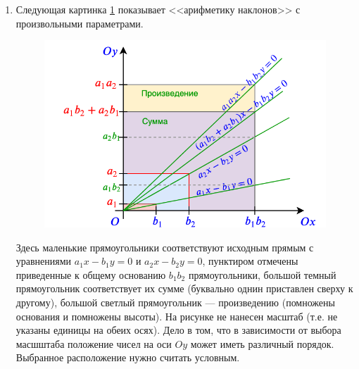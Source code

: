 \begin{enumerate}
\item Следующая картинка \ref{linear} показывает <<арифметику наклонов>> с произвольными параметрами.
\begin{figure}[htb!]
\begin{center}
\includegraphics[scale=0.5]{linear.png}
\end{center}
\caption{}\label{linear}
\end{figure}
Здесь маленькие прямоугольники соответствуют исходным прямым с уравнениями $a_1x-b_1y=0$ и $a_2x-b_2y=0$, пунктиром отмечены приведенные к общему основанию $b_1b_2$ прямоугольники, большой темный прямоугольник соответствует их сумме (буквально однин приставлен сверху к другому), большой светлый прямоугольник --- произведению (помножены основания и помножены высоты). На рисунке не нанесен масштаб (т.е. не указаны единицы на обеих осях). Дело в том, что в зависимости от выбора масшштаба положение чисел на оси $Oy$ может иметь различный порядок. Выбранное расположение нужно считать условным.


\end{enumerate}
